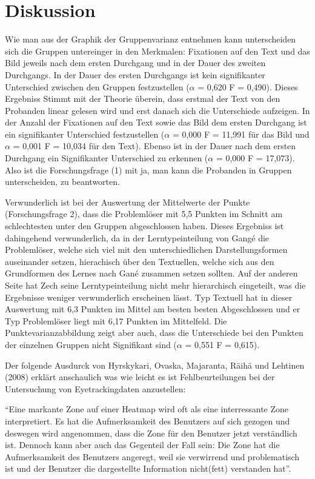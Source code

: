 \chapter{Diskussion}

Wie man aus der Graphik der Gruppenvarianz entnehmen kann unterscheiden sich die Gruppen untereinger in den Merkmalen: Fixationen auf den Text und das Bild jeweils nach dem ersten Durchgang und in der Dauer des zweiten Durchgangs. In der Dauer des ersten Durchgangs ist kein signifikanter Unterschied zwischen den Gruppen festzustellen ($\alpha$ = 0,620 F = 0,490). Dieses Ergebniss Stimmt mit der Theorie überein, dass erstmal der Text von den Probanden linear gelesen wird und erst danach sich die Unterschiede aufzeigen. In der Anzahl der Fixationen auf den Text sowie das Bild dem ersten Durchgang ist ein signifikanter Unterschied festzustellen ($\alpha$ = 0,000 F = 11,991 für das Bild und $\alpha$ = 0,001 F = 10,034 für den Text). Ebenso ist in der Dauer nach dem ersten Durchgang ein Signifikanter Unterschied zu erkennen ($\alpha$ = 0,000 F = 17,073). Also ist die Forschungsfrage (1) mit ja, man kann die Probanden in Gruppen unterscheiden, zu beantworten.

Verwunderlich ist bei der Auswertung der Mittelwerte der Punkte (Forschungsfrage 2), dass die Problemlöser mit 5,5 Punkten im Schnitt am schlechtesten unter den Gruppen abgeschlossen haben. Dieses Ergebniss ist dahingehend verwunderlich, da in der Lerntypeinteilung von Gangé die Problemlöser, welche sich viel mit den unterschiedlichen Darstellungsformen auseinander setzen, hierachisch über den Textuellen, welche sich aus den Grundformen des Lernes nach Gané zusammen setzen sollten. Auf der anderen Seite hat Zech seine Lerntypeinteilung nicht mehr hierarchisch eingeteilt, was die Ergebnisse weniger verwunderlich erscheinen lässt. Typ Textuell hat in dieser Auswertung mit 6,3 Punkten im Mittel am besten besten Abgeschlossen und er Typ Problemlöser liegt mit 6,17 Punkten im Mittelfeld. Die Punktevarianzabbildung zeigt aber auch, dass die Unterschiede bei den Punkten der einzelnen Gruppen nicht Signifikant sind ($\alpha$ = 0,551 F = 0,615). 

Der folgende Ausdurck von Hyrskykari, Ovaska, Majaranta, Räihä und Lehtinen (2008) erklärt anschaulich was wie leicht es ist Fehlbeurteilungen bei der Untersuchung von Eyetrackingdaten anzustellen:

``Eine markante Zone auf einer Heatmap wird oft als eine interressante Zone interpretiert. Es hat die Aufmerksamkeit des Benutzers auf sich gezogen und deswegen wird angenommen, dass die Zone für den Benutzer jetzt verständlich ist. Dennoch kann aber auch das Gegenteil der Fall sein: Die Zone hat die Aufmerksamkeit des Benutzers angeregt, weil sie verwirrend und problematisch ist und der Benutzer die dargestellte Information nicht(fett) verstanden hat''\cite{hyrskykari2008gaze}.

